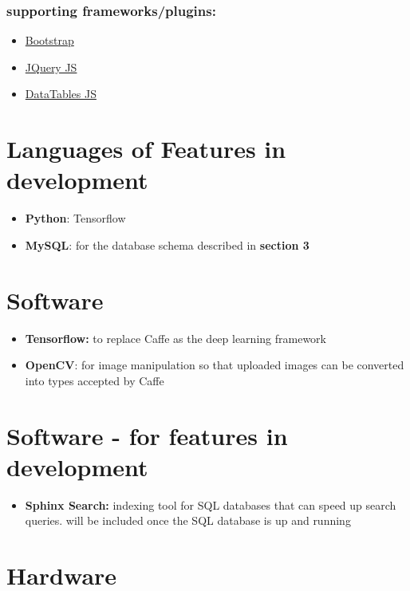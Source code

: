 \documentclass{scrreprt}
\begin{document}
\subsubsection{supporting frameworks/plugins:}

\begin{itemize}
    \item \href{http://getbootstrap.com/}{Bootstrap}
    \item \href{https://jquery.com/}{JQuery JS}
    \item \href{https://datatables.net/}{DataTables JS}
\end{itemize}

\section{Languages of Features in development}

\begin{itemize}
    \item \textbf{Python}: Tensorflow
    \item \textbf{MySQL}: for the database schema described in \textbf{section 3}
\end{itemize}

\section{Software}

\begin{itemize}
    \item \textbf{Tensorflow:} to replace Caffe as the deep learning framework
    \item \textbf{OpenCV}: for image manipulation so that uploaded images can
            be converted into types accepted by Caffe
\end{itemize}

\section{Software - for features in development}

\begin{itemize}
    \item \textbf{Sphinx Search:} indexing tool for SQL databases that can speed up search queries. will be included once the SQL database is up and running
\end{itemize}

\section{Hardware}
\end{document}
